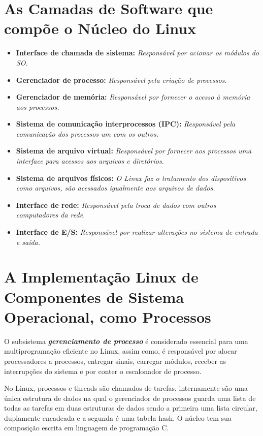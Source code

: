 \documentclass[
	12pt,				%
	oneside,   	        %
	a4paper,			%
	english,			%
	french,				%
	spanish,			%
	brazil,				%
	]{pacotes/abntex2}
\begin{document}
\section{\textbf{As Camadas de Software que compõe o Núcleo do Linux}}
\label{sec:camadas-software}

\begin{itemize}
    \item \textbf{Interface de chamada de sistema:} 
        \textit{Responsável por acionar os módulos do SO.}
    \item \textbf{Gerenciador de processo:} 
        \textit{Responsável pela criação de processos.}
    \item \textbf{Gerenciador de memória:} 
        \textit{Responsável por fornecer o acesso à memória aos processos.}
    \item \textbf{Sistema de comunicação interprocessos (IPC):} 
        \textit{Responsável pela comunicação dos processos um com os outros.}
    \item \textbf{Sistema de arquivo virtual:} 
        \textit{Responsável por fornecer aos processos uma interface para acessos aos arquivos e diretórios.}
    \item \textbf{Sistema de arquivos físicos:}
        \textit{O Linux faz o tratamento dos dispositivos como arquivos, são acessados igualmente aos arquivos de dados.}
    \item \textbf{Interface de rede:} 
        \textit{Responsável pela troca de dados com outros computadores da rede.}
    \item \textbf{Interface de E/S:} 
        \textit{Responsável por realizar alterações no sistema de entrada e saída.}
\end{itemize}

\section{\textbf{A Implementação Linux de Componentes de Sistema Operacional, como Processos}}
\label{sec:componentes-linux}

O subsistema \textbf{\textit{gerenciamento de processo}} é considerado essencial para uma multiprogramação eficiente no Linux, assim como, é responsável por alocar processadores a processos, entregar sinais, carregar módulos, receber as interrupções do sistema e por conter o escalonador de processo. \cite{processos-linux}

No Linux, processos e threads são chamados de tarefas, internamente são uma única estrutura de dados na qual o gerenciador de processos guarda uma lista de todas as tarefas em duas estruturas de dados sendo a primeira uma lista circular, duplamente encadeada e a segunda é uma tabela hash. O núcleo tem sua composição escrita em linguagem de programação C. 
\end{document}
